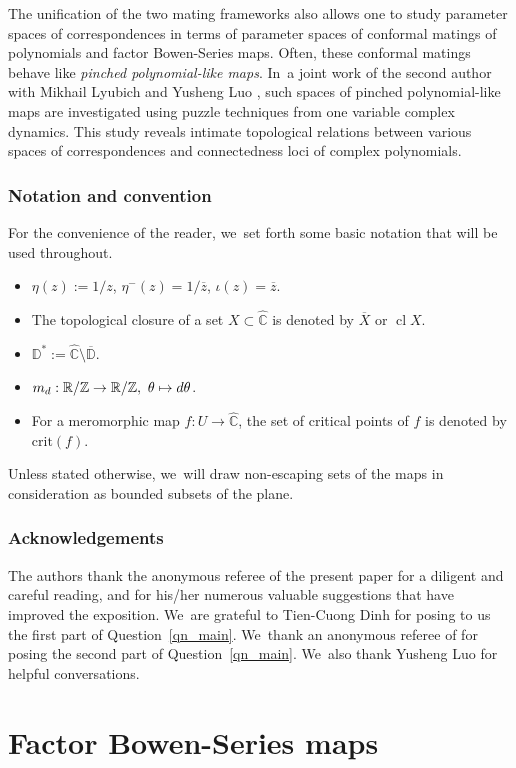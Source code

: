 \documentclass[JEP,XML,SOM,Unicode,NoFloatCountersInSection,published]{cedram}
\def\mto{\mathchoice{\longmapsto}{\mapsto}{\mapsto}{\mapsto}}
\theoremstyle{definition}
\theoremstyle{remark}
\newcommand{\C}{\mathbb{C}}
\newcommand{\D}{\mathbb{D}}
\newcommand{\R}{\mathbb{R}}
\newcommand{\Z}{\mathbb{Z}}
\DeclareMathOperator{\Cl}{cl}
\begin{document}
The unification of the two mating frameworks also allows one to study parameter spaces of correspondences in terms of parameter spaces of conformal matings of polynomials and factor Bowen-Series maps. Often, these conformal matings behave like \emph{pinched polynomial-like maps}. In~a joint work of the second author with Mikhail Lyubich and Yusheng Luo \cite{LLM24}, such spaces of pinched polynomial-like maps are investigated using puzzle techniques from one variable complex dynamics. This study reveals intimate topological relations between various spaces of correspondences and connectedness loci of complex polynomials.

\subsubsection*{Notation and convention}
For the convenience of the reader, we~set forth some basic notation that will be used throughout.
\begin{itemize}
\item $\eta(z):= 1/z$, $\eta^{-}(z)=1/\overline{z}$, $\iota(z)=\overline{z}$.
\item The topological closure of a set $X\subset\widehat{\C}$ is denoted by $\overline{X}$ or $\Cl{X}$.
\item $\D^*:= \widehat{\C}\setminus\overline{\D}$.
\item $m_d:\R/\Z\to\R/\Z,\ \theta\mto d\theta$.
\item For a meromorphic map $f:U\to\widehat{\C}$, the set of critical points of $f$ is denoted by $\mathrm{crit}(f)$.
\end{itemize}

Unless stated otherwise, we~will draw non-escaping sets of the maps in consideration as bounded subsets of the plane.

\subsubsection*{Acknowledgements}
The authors thank the anonymous referee of the present paper for a diligent and careful reading, and for his/her numerous valuable suggestions that have improved the exposition. We~are grateful to Tien-Cuong Dinh for posing to us the first part of Question~\ref{qn_main}. We~thank an anonymous referee of \cite{sullivan_survey} for posing the second part of Question~\ref{qn_main}. We~also thank Yusheng Luo for helpful conversations.

\section{Factor Bowen-Series maps}\label{factor_bs_sec}
\end{document}
